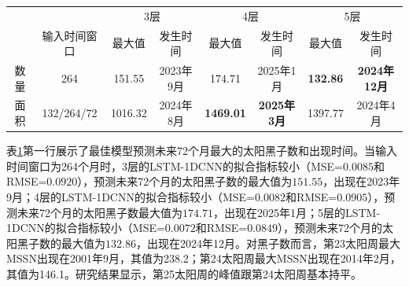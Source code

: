 \begin{table}[!htbp]
\centering
{}
\label{tab:ss_out_72}
\footnotesize
\begin{tabular}{cccccccc}
    \toprule
    &  & \multicolumn{2}{c}{3层} & \multicolumn{2}{c}{4层} & \multicolumn{2}{c}{5层}\\
    \cmidrule(lr){3-4} \cmidrule(lr){5-6} \cmidrule(lr){7-8}
    \noalign{\smallskip}
     & 输入时间窗口 & 最大值 & 发生时间 & 最大值 & 发生时间 & 最大值 & 发生时间 \\
    \midrule
    数量 & 264 & 151.55 & 2023年9月 & 174.71 & 2025年1月 & \textbf{132.86} & \textbf{2024年12月} \\
    面积 & 132/264/72 & 1016.32 & 2024年8月 & \textbf{1469.01} & \textbf{2025年3月} & 1397.77 & 2024年4月 \\
    \bottomrule
  \end{tabular}
\end{table}

表\ref{tab:ss_out_72}第一行展示了最佳模型预测未来72个月最大的太阳黑子数和出现时间。当输入时间窗口为264个月时，3层的LSTM-1DCNN的拟合指标较小（MSE=$0.0085$和RMSE=$0.0920$），预测未来72个月的太阳黑子数的最大值为$151.55$，出现在2023年9月；4层的LSTM-1DCNN的拟合指标较小（MSE=$0.0082$和RMSE=$0.0905$），预测未来72个月的太阳黑子数最大值为$174.71$，出现在2025年1月；5层的LSTM-1DCNN的拟合指标较小（MSE=$0.0072$和RMSE=$0.0849$），预测未来72个月的太阳黑子数的最大值为$132.86$，出现在2024年12月。对黑子数而言，第23太阳周最大MSSN出现在2001年9月，其值为238.2；第24太阳周最大MSSN出现在2014年2月，其值为146.1。研究结果显示，第25太阳周的峰值跟第24太阳周基本持平。 

